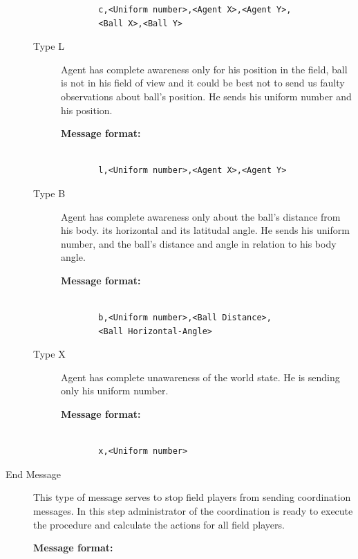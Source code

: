 \begin{description}
\begin{description}
\begin{description}
\begin{verbatim}
  c,<Uniform number>,<Agent X>,<Agent Y>,
  <Ball X>,<Ball Y>
  \end{verbatim}
\end{description}

\item[Type L] Agent has complete awareness only for his position in the field, ball is not in his field of view and it could be best not to send us faulty observations about ball's position. He sends his uniform number and his position.

\begin{description}
  \item[{\bf Message format:}]
  \begin{verbatim}
  
  l,<Uniform number>,<Agent X>,<Agent Y>
  \end{verbatim}
\end{description}

\item[Type B] Agent has complete awareness only about the ball's distance from his body. its horizontal and its latitudal angle. He sends his uniform number,  and the ball's distance and angle in relation to his body angle.

\begin{description}
  \item[{\bf Message format:}]
  \begin{verbatim}
  
  b,<Uniform number>,<Ball Distance>,
  <Ball Horizontal-Angle>
  \end{verbatim}
\end{description}

\item[Type X] Agent has complete unawareness of the world state. He is sending only his uniform number.

\begin{description}
  \item[{\bf Message format:}]
  \begin{verbatim}
 
  x,<Uniform number>
  \end{verbatim}
\end{description}

\end{description}
\item[End Message]
This type of message serves to stop field players from sending coordination messages. In this step administrator of the coordination is ready to execute the procedure and calculate the actions for all field players.
\begin{description}
  \item[{\bf Message format:}]
  \begin{verbatim}
  

\end{verbatim}
\end{description}
\end{description}
